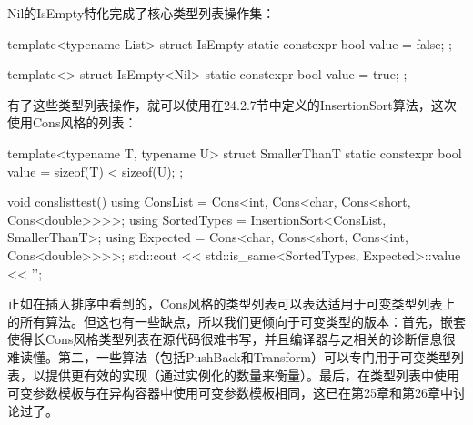 Nil的IsEmpty特化完成了核心类型列表操作集：

\begin{cpp}
template<typename List>
struct IsEmpty {
	static constexpr bool value = false;
};

template<>
struct IsEmpty<Nil> {
	static constexpr bool value = true;
};
\end{cpp}

有了这些类型列表操作，就可以使用在24.2.7节中定义的InsertionSort算法，这次使用Cons风格的列表：

\begin{cpp}
template<typename T, typename U>
struct SmallerThanT {
	static constexpr bool value = sizeof(T) < sizeof(U);
};

void conslisttest()
{
	using ConsList = Cons<int, Cons<char, Cons<short, Cons<double>>>>;
	using SortedTypes = InsertionSort<ConsList, SmallerThanT>;
	using Expected = Cons<char, Cons<short, Cons<int, Cons<double>>>>;
	std::cout << std::is_same<SortedTypes, Expected>::value << '\n';
}
\end{cpp}

正如在插入排序中看到的，Cons风格的类型列表可以表达适用于可变类型列表上的所有算法。但这也有一些缺点，所以我们更倾向于可变类型的版本：首先，嵌套使得长Cons风格类型列表在源代码很难书写，并且编译器与之相关的诊断信息很难读懂。第二，一些算法（包括PushBack和Transform）可以专门用于可变类型列表，以提供更有效的实现（通过实例化的数量来衡量）。最后，在类型列表中使用可变参数模板与在异构容器中使用可变参数模板相同，这已在第25章和第26章中讨论过了。





















